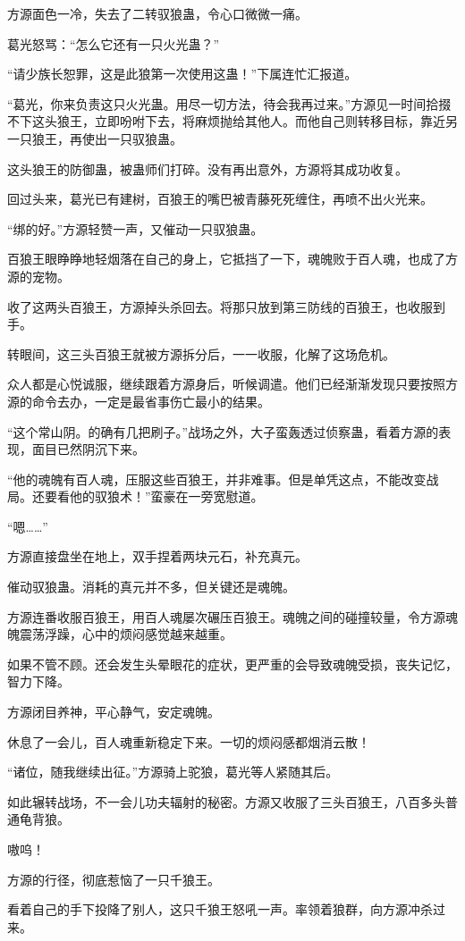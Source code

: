 \begin{this_body}
方源面色一冷，失去了二转驭狼蛊，令心口微微一痛。

葛光怒骂：“怎么它还有一只火光蛊？”

“请少族长恕罪，这是此狼第一次使用这蛊！”下属连忙汇报道。

“葛光，你来负责这只火光蛊。用尽一切方法，待会我再过来。”方源见一时间拾掇不下这头狼王，立即吩咐下去，将麻烦抛给其他人。而他自己则转移目标，靠近另一只狼王，再使出一只驭狼蛊。

这头狼王的防御蛊，被蛊师们打碎。没有再出意外，方源将其成功收复。

回过头来，葛光已有建树，百狼王的嘴巴被青藤死死缠住，再喷不出火光来。

“绑的好。”方源轻赞一声，又催动一只驭狼蛊。

百狼王眼睁睁地轻烟落在自己的身上，它抵挡了一下，魂魄败于百人魂，也成了方源的宠物。

收了这两头百狼王，方源掉头杀回去。将那只放到第三防线的百狼王，也收服到手。

转眼间，这三头百狼王就被方源拆分后，一一收服，化解了这场危机。

众人都是心悦诚服，继续跟着方源身后，听候调遣。他们已经渐渐发现只要按照方源的命令去办，一定是最省事伤亡最小的结果。

“这个常山阴。的确有几把刷子。”战场之外，大子蛮轰透过侦察蛊，看着方源的表现，面目已然阴沉下来。

“他的魂魄有百人魂，压服这些百狼王，并非难事。但是单凭这点，不能改变战局。还要看他的驭狼术！”蛮豪在一旁宽慰道。

“嗯……”

方源直接盘坐在地上，双手捏着两块元石，补充真元。

催动驭狼蛊。消耗的真元并不多，但关键还是魂魄。

方源连番收服百狼王，用百人魂屡次碾压百狼王。魂魄之间的碰撞较量，令方源魂魄震荡浮躁，心中的烦闷感觉越来越重。

如果不管不顾。还会发生头晕眼花的症状，更严重的会导致魂魄受损，丧失记忆，智力下降。

方源闭目养神，平心静气，安定魂魄。

休息了一会儿，百人魂重新稳定下来。一切的烦闷感都烟消云散！

“诸位，随我继续出征。”方源骑上驼狼，葛光等人紧随其后。

如此辗转战场，不一会儿功夫辐射的秘密。方源又收服了三头百狼王，八百多头普通龟背狼。

嗷呜！

方源的行径，彻底惹恼了一只千狼王。

看着自己的手下投降了别人，这只千狼王怒吼一声。率领着狼群，向方源冲杀过来。


\end{this_body}
